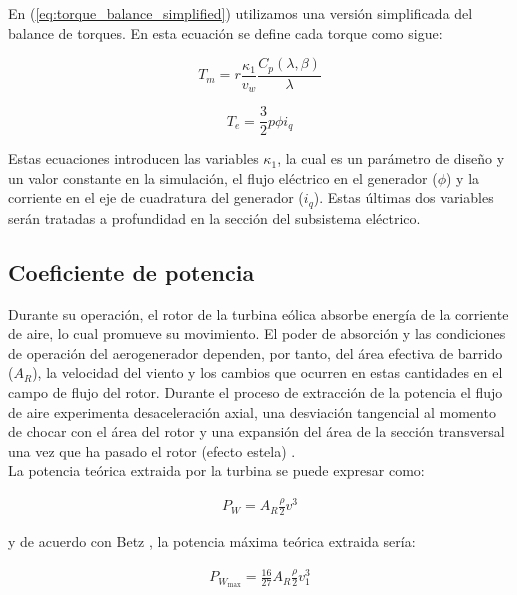 {En (\ref{eq:torque_balance_simplified}) utilizamos una versión simplificada del balance de torques. 
En esta ecuación se define cada torque como sigue:

\begin{equation}
    T_m = r\frac{\kappa_1}{v_w} \frac{C_p(\lambda,\beta)}{\lambda}
    \label{eq:mechanical_torque}
\end{equation}

\begin{equation}
    T_e = \frac{3}{2}p\phi i_q
    \label{eq:electrical_torque}
\end{equation}

Estas ecuaciones introducen las variables $\kappa_1$, la cual es un parámetro de diseño y un valor 
constante en la simulación, el flujo eléctrico en el generador ($\phi$) y la corriente en el eje de 
cuadratura del generador ($i_q$). Estas últimas dos variables serán tratadas
a profundidad en la sección del subsistema eléctrico.



\subsection{Coeficiente de potencia}

Durante su operación, el rotor de la turbina eólica absorbe energía de la corriente de aire, 
lo cual promueve su movimiento. El poder de absorción y las condiciones de operación del aerogenerador dependen, por tanto, 
del área efectiva de barrido ($A_R$), la velocidad del viento y los cambios que ocurren en estas 
cantidades en el campo de flujo del rotor. Durante el proceso de extracción de la potencia el flujo de aire experimenta
desaceleración axial, una desviación tangencial al momento de chocar con el área del rotor y una 
expansión del área de la sección transversal una vez que ha pasado el rotor (efecto estela) \cite{heier2014}.
\\

La potencia teórica extraida por la turbina se puede expresar como:

\begin{align}
    P_W = A_R\frac{\rho}{2}v^3
    \label{eq:theoretical_power}
\end{align}

y de acuerdo con Betz \cite{betz1926}, la potencia máxima teórica extraida sería:

\begin{align}
    P_{W_{\text{max}}} = \frac{16}{27}A_R\frac{\rho}{2}v_1^3 
    \label{eq:max_theoretical_power}
\end{align}

}
